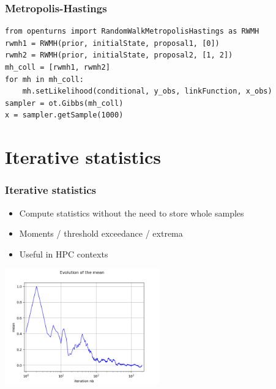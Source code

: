 \documentclass[aspectratio=169]{beamer}
\begin{document}
\begin{frame}[containsverbatim]
\frametitle{Metropolis-Hastings}

\lstset{language=python}
\begin{lstlisting}
from openturns import RandomWalkMetropolisHastings as RWMH
rwmh1 = RWMH(prior, initialState, proposal1, [0])
rwmh2 = RWMH(prior, initialState, proposal2, [1, 2])
mh_coll = [rwmh1, rwmh2]
for mh in mh_coll:
    mh.setLikelihood(conditional, y_obs, linkFunction, x_obs)
sampler = ot.Gibbs(mh_coll)
x = sampler.getSample(1000)
\end{lstlisting}


\end{frame}

\section{Iterative statistics}


\begin{frame}[containsverbatim]
\frametitle{Iterative statistics}

\begin{itemize}
\item Compute statistics without the need to store whole samples
\item Moments / threshold exceedance / extrema
\item Useful in HPC contexts
\end{itemize}

\begin{center}
\includegraphics[width=0.5\textwidth]{figures/sphx_glr_plot_iterative_moments_001.png}
\end{center}
\end{frame}
\end{document}
